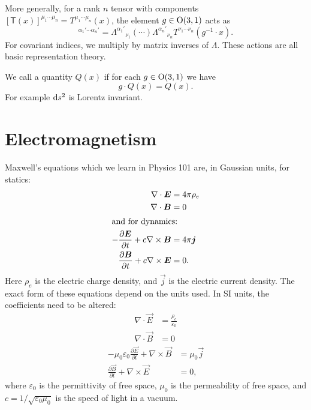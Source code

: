 More generally, for a rank $n$ tensor with components $[\mathsf{T}(x)]^{\mu_{1}\cdots\mu_{n}}=T^{\mu_{1}\cdots\mu_{n}}(x)$,
the element $g\in\O(3,1)$ acts as
\begin{equation}
[(g\cdot \tens{T})(x)]^{\alpha_{1}'\cdots\alpha_{n}'}
= {\Lambda^{\alpha_{1}'}}_{\nu_{1}}(\cdots){\Lambda^{\alpha_{n}'}}_{\nu_{n}}
T^{\nu_{1}\cdots\nu_{n}}(g^{-1}\cdot x).
\end{equation}
For covariant indices, we multiply by matrix inverses of $\Lambda$.
These actions are all basic representation theory.

We call a quantity $Q(x)$  if for each $g\in\O(3,1)$
we have
\begin{equation}
g\cdot Q(x) = Q(x).
\end{equation}
For example $\D s^{2}$ is Lorentz invariant.

\section{Electromagnetism}

Maxwell's equations which we learn in Physics 101 are, in Gaussian
units, for statics:
\begin{subequations}
\begin{align}
\nabla\cdot\vec{E} &= 4\pi\rho_{e}\\
\nabla\cdot\vec{B} &= 0\\
\intertext{and for dynamics:}
-\frac{\partial\vec{E}}{\partial t} + c\nabla\times\vec{B} &= 4\pi\vec{j}\\
\frac{\partial\vec{B}}{\partial t} + c\nabla\times\vec{E} &= 0.
\end{align}
\end{subequations}
Here $\rho_{e}$ is the electric charge density, and $\vec{j}$ is
the electric current density.
The exact form of these equations depend on the units used. In SI units,
the coefficients need to be altered:
\begin{subequations}
\begin{align}
\nabla\cdot\vec{E} &= \frac{\rho_{e}}{\varepsilon_{0}}\\
\nabla\cdot\vec{B} &= 0
\end{align}
\end{subequations}
\begin{subequations}
\begin{align}
-\mu_{0}\varepsilon_{0}\frac{\partial\vec{E}}{\partial t} + \nabla\times\vec{B} &= \mu_{0}\vec{j}\\
\frac{\partial\vec{B}}{\partial t} + \nabla\times\vec{E} &= 0,
\end{align}
\end{subequations}
where $\varepsilon_{0}$ is the permittivity of free space, $\mu_{0}$ is
the permeability of free space, and $c=1/\sqrt{\varepsilon_{0}\mu_{0}}$
is the speed of light in a vacuum.

